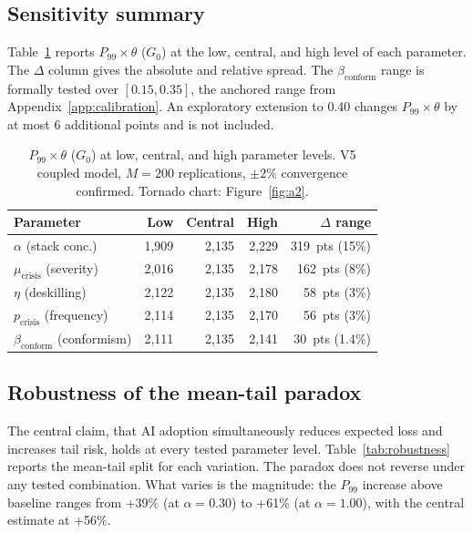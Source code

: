 \documentclass[11pt,a4paper]{article}
\begin{document}
\begin{appendices}
\subsection{Sensitivity summary}\label{app:sens:summary}

Table~\ref{tab:sensitivity} reports $P_{99}\times\theta$ ($G_0$) at the
low, central, and high level of each parameter. The $\Delta$ column gives
the absolute and relative spread. The $\beta_{\text{conform}}$ range is
formally tested over $[0.15, 0.35]$, the anchored range from
Appendix~\ref{app:calibration}. An exploratory extension to 0.40 changes
$P_{99}\times\theta$ by at most 6 additional points and is not included.

\begin{table}[H]
\centering\small
\setlength{\tabcolsep}{8pt}
\renewcommand{\arraystretch}{1.20}
\begin{tabular}{@{}l r r r r@{}}
\toprule
\textbf{Parameter} &
\textbf{Low} & \textbf{Central} & \textbf{High} &
\textbf{$\Delta$ range} \\
\midrule
$\alpha$ (stack conc.)
  & 1{,}909 & 2{,}135 & 2{,}229 & 319~pts (15\%) \\
$\mu_{\text{crisis}}$ (severity)
  & 2{,}016 & 2{,}135 & 2{,}178 & 162~pts (8\%) \\
$\eta$ (deskilling)
  & 2{,}122 & 2{,}135 & 2{,}180 & 58~pts (3\%) \\
$p_{\text{crisis}}$ (frequency)
  & 2{,}114 & 2{,}135 & 2{,}170 & 56~pts (3\%) \\
$\beta_{\text{conform}}$ (conformism)
  & 2{,}111 & 2{,}135 & 2{,}141 & 30~pts (1.4\%) \\
\bottomrule
\end{tabular}
\caption{$P_{99}\times\theta$ ($G_0$) at low, central, and high parameter
levels. V5 coupled model, $M = 200$ replications, $\pm 2\%$ convergence
confirmed. Tornado chart: Figure~\ref{fig:a2}.}
\label{tab:sensitivity}
\end{table}

\subsection{Robustness of the mean-tail paradox}\label{app:sens:robustness}

The central claim, that AI adoption simultaneously reduces expected loss and
increases tail risk, holds at every tested parameter level.
Table~\ref{tab:robustness} reports the mean-tail split for each variation.
The paradox does not reverse under any tested combination. What varies is
the magnitude: the $P_{99}$ increase above baseline ranges from +39\% (at
$\alpha = 0.30$) to +61\% (at $\alpha = 1.00$), with the central estimate
at +56\%.


\end{appendices}
\end{document}
